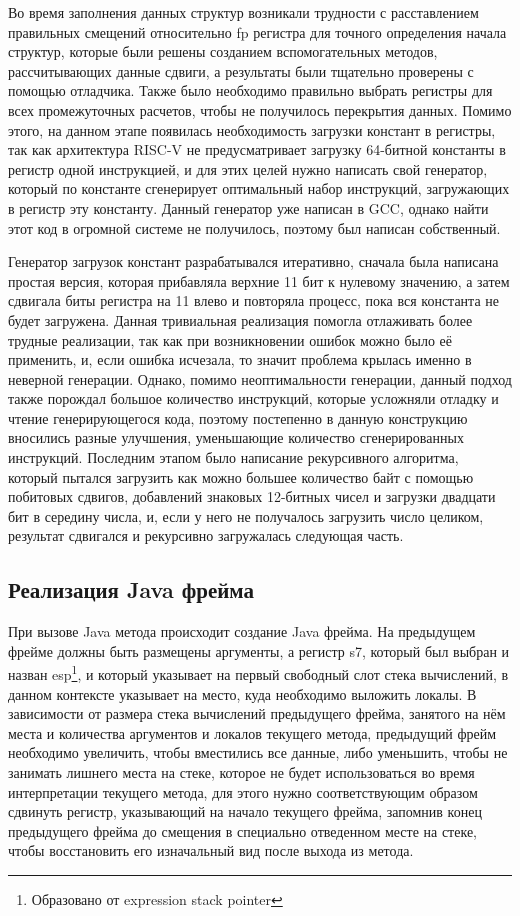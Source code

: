 
Во время заполнения данных структур возникали трудности с расставлением правильных смещений относительно fp регистра для точного определения начала структур, которые были решены созданием вспомогательных методов, рассчитывающих данные сдвиги, а результаты были тщательно проверены с помощью отладчика. Также было необходимо правильно выбрать регистры для всех промежуточных расчетов, чтобы не получилось перекрытия данных. Помимо этого, на данном этапе появилась необходимость загрузки констант в регистры, так как архитектура RISC-V не предусматривает загрузку 64-битной константы в регистр одной инструкцией, и для этих целей нужно написать свой генератор, который по константе сгенерирует оптимальный набор инструкций, загружающих в регистр эту константу. Данный генератор уже написан в GCC, однако найти этот код в огромной системе не получилось, поэтому был написан собственный.

Генератор загрузок констант разрабатывался итеративно, сначала была написана простая версия, которая прибавляла верхние 11 бит к нулевому значению, а затем сдвигала биты регистра на 11 влево и повторяла процесс, пока вся константа не будет загружена. Данная тривиальная реализация помогла отлаживать более трудные реализации, так как при возникновении ошибок можно было её применить, и, если ошибка исчезала, то значит проблема крылась именно в неверной генерации. Однако, помимо неоптимальности генерации, данный подход также порождал большое количество инструкций, которые усложняли отладку и чтение генерирующегося кода, поэтому постепенно в данную конструкцию вносились разные улучшения, уменьшающие количество сгенерированных инструкций. Последним этапом было написание рекурсивного алгоритма, который пытался загрузить как можно большее количество байт с помощью побитовых сдвигов, добавлений знаковых 12-битных чисел и загрузки двадцати бит в середину числа, и, если у него не получалось загрузить число целиком, результат сдвигался и рекурсивно загружалась следующая часть. 



\subsection{Реализация Java фрейма}
При вызове Java метода происходит создание Java фрейма. На предыдущем фрейме должны быть размещены аргументы, а регистр s7, который был выбран и назван esp\footnote{Образовано от expression stack pointer}, и который указывает на первый свободный слот стека вычислений, в данном контексте указывает на место, куда необходимо выложить локалы. В зависимости от размера стека вычислений предыдущего фрейма, занятого на нём места и количества аргументов и локалов текущего метода, предыдущий фрейм необходимо увеличить, чтобы вместились все данные, либо уменьшить, чтобы не занимать лишнего места на стеке, которое не будет использоваться во время интерпретации текущего метода, для этого нужно соответствующим образом сдвинуть регистр, указывающий на начало текущего фрейма, запомнив конец предыдущего фрейма до смещения в специально отведенном месте на стеке, чтобы восстановить его изначальный вид после выхода из метода.

